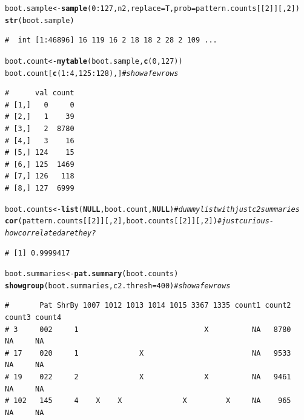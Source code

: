 \documentclass{article}\usepackage[]{graphicx}\usepackage[]{color}
\makeatletter
\newcommand{\hlnum}[1]{\textcolor[rgb]{0.686,0.059,0.569}{#1}}%
\newcommand{\hlcom}[1]{\textcolor[rgb]{0.678,0.584,0.686}{\textit{#1}}}%
\newcommand{\hlopt}[1]{\textcolor[rgb]{0,0,0}{#1}}%
\newcommand{\hlstd}[1]{\textcolor[rgb]{0.345,0.345,0.345}{#1}}%
\newcommand{\hlkwa}[1]{\textcolor[rgb]{0.161,0.373,0.58}{\textbf{#1}}}%
\newcommand{\hlkwb}[1]{\textcolor[rgb]{0.69,0.353,0.396}{#1}}%
\newcommand{\hlkwc}[1]{\textcolor[rgb]{0.333,0.667,0.333}{#1}}%
\newcommand{\hlkwd}[1]{\textcolor[rgb]{0.737,0.353,0.396}{\textbf{#1}}}%
\newenvironment{kframe}{%
 \def\at@end@of@kframe{}%
 \ifinner\ifhmode%
  \def\at@end@of@kframe{\end{minipage}}%
  \begin{minipage}{\columnwidth}%
 \fi\fi%
 \def\FrameCommand##1{\hskip\@totalleftmargin \hskip-\fboxsep
 \colorbox{shadecolor}{##1}\hskip-\fboxsep
     \hskip-\linewidth \hskip-\@totalleftmargin \hskip\columnwidth}%
 \MakeFramed {\advance\hsize-\width
   \@totalleftmargin\z@ \linewidth\hsize
   \@setminipage}}%
 {\par\unskip\endMakeFramed%
 \at@end@of@kframe}
\newenvironment{knitrout}{}{} %
\makeatother
\begin{document}
\begin{knitrout}\footnotesize
{}\color{fgcolor}\begin{kframe}
\begin{alltt}
\hlstd{boot.sample} \hlkwb{<-} \hlkwd{sample}\hlstd{(}\hlnum{0}\hlopt{:}\hlnum{127}\hlstd{,n2,}\hlkwc{replace}\hlstd{=T,}\hlkwc{prob}\hlstd{=pattern.counts[[}\hlnum{2}\hlstd{]][,}\hlnum{2}\hlstd{])}
\hlkwd{str}\hlstd{(boot.sample)}
\end{alltt}
\begin{verbatim}
#  int [1:46896] 16 119 16 2 18 18 2 28 2 109 ...
\end{verbatim}
\begin{alltt}
\hlstd{boot.count} \hlkwb{<-} \hlkwd{mytable}\hlstd{(boot.sample,}\hlkwd{c}\hlstd{(}\hlnum{0}\hlstd{,}\hlnum{127}\hlstd{))}
\hlstd{boot.count[}\hlkwd{c}\hlstd{(}\hlnum{1}\hlopt{:}\hlnum{4}\hlstd{,}\hlnum{125}\hlopt{:}\hlnum{128}\hlstd{),]} \hlcom{# show a few rows}
\end{alltt}
\begin{verbatim}
#      val count
# [1,]   0     0
# [2,]   1    39
# [3,]   2  8780
# [4,]   3    16
# [5,] 124    15
# [6,] 125  1469
# [7,] 126   118
# [8,] 127  6999
\end{verbatim}
\begin{alltt}
\hlstd{boot.counts} \hlkwb{<-} \hlkwd{list}\hlstd{(}\hlkwa{NULL}\hlstd{,boot.count,}\hlkwa{NULL}\hlstd{)} \hlcom{# dummy list with just c2 summaries}
\hlkwd{cor}\hlstd{(pattern.counts[[}\hlnum{2}\hlstd{]][,}\hlnum{2}\hlstd{],boot.counts[[}\hlnum{2}\hlstd{]][,}\hlnum{2}\hlstd{])} \hlcom{# just curious - how correlated are they?}
\end{alltt}
\begin{verbatim}
# [1] 0.9999417
\end{verbatim}
\begin{alltt}
\hlstd{boot.summaries} \hlkwb{<-} \hlkwd{pat.summary}\hlstd{(boot.counts)}
\hlkwd{showgroup}\hlstd{(boot.summaries,}\hlkwc{c2.thresh}\hlstd{=}\hlnum{400}\hlstd{)} \hlcom{#show a few rows}
\end{alltt}
\begin{verbatim}
#       Pat ShrBy 1007 1012 1013 1014 1015 3367 1335 count1 count2 count3 count4
# 3     002     1                             X          NA   8780     NA     NA
# 17    020     1              X                         NA   9533     NA     NA
# 19    022     2              X              X          NA   9461     NA     NA
# 102   145     4    X    X              X         X     NA    965     NA     NA

\end{verbatim}
\end{kframe}
\end{knitrout}
\end{document}
